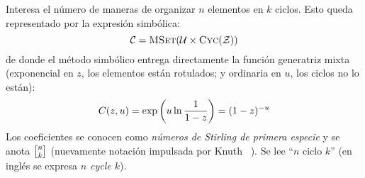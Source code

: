   Interesa el número de maneras
  de organizar \(n\) elementos en \(k\) ciclos.
  Esto queda representado por la expresión simbólica:%
  \begin{equation*}
    \mathcal{C}
      = \operatorname{\textsc{MSet}}(\mathcal{U} \times \operatorname{\textsc{Cyc}}(\mathcal{Z}))
  \end{equation*}
  de donde el método simbólico entrega directamente
  la función generatriz mixta%
  (exponencial en \(z\),
   los elementos están rotulados;
   y ordinaria en \(u\),
   los ciclos no lo están):
  \begin{equation}
    \label{eq:Stirling-1-EGF}
    \index{Stirling, numeros de@Stirling, números de!primera especie!funcion generatriz@función generatriz}
    C(z, u)
      = \exp \left( u \ln \frac{1}{1 - z} \right)
      = (1 - z)^{-u}
  \end{equation}
  Los coeficientes
  se conocen como \emph{números de Stirling de primera especie}
  y se anota \(\cycle{n}{k}\)
  (nuevamente notación impulsada por Knuth~%
    \cite{knuth92:_two_notes_notat}).
  Se lee ``\(n\) ciclo \(k\)''
  (en inglés
   se expresa \emph{\(n\) \foreignlanguage{english}{cycle} \(k\)}).

